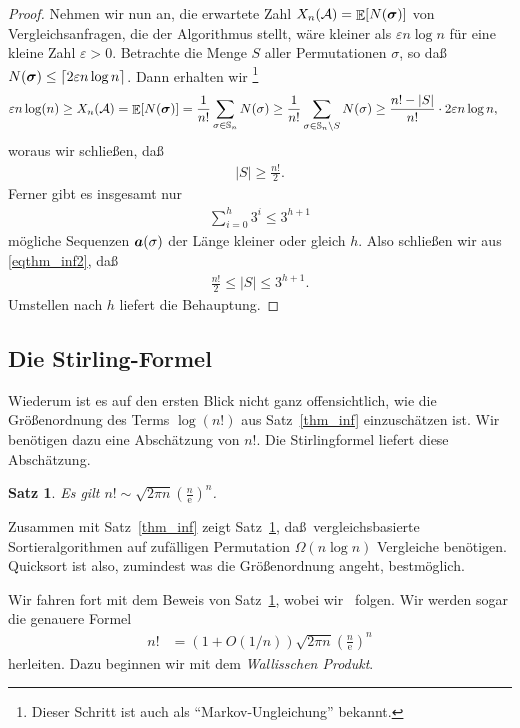 \documentclass[10pt,reqno]{amsart}
\numberwithin{equation}{section}
\newcommand\cA{\mathcal A}
\newcommand\va{\vec a}
\renewcommand\SS{\mathbb S}
\def\vec#1{\mathchoice{\mbox{\boldmath$\displaystyle#1$}}
{\mbox{\boldmath$\textstyle#1$}}
{\mbox{\boldmath$\scriptstyle#1$}}
{\mbox{\boldmath$\scriptscriptstyle#1$}}}
\DeclareMathOperator{\ex}{\mathbb E}
\newtheorem{theorem}[definition]{Satz}
\newcommand\eul{\mathrm{e}}
\newcommand\eps{\varepsilon}
\newcommand\bc[1]{\left({#1}\right)}
\newcommand\bcfr[2]{\bc{\frac{#1}{#2}}}
\newcommand\Thm{Satz}
\begin{document}
\begin{proof}
	Nehmen wir nun an, die erwartete Zahl $X_n(\cA)=\ex[N(\vec\sigma)]$ von Vergleichsanfragen, die der Algorithmus stellt, w\"are kleiner als $\eps n\log n$ f\"ur eine kleine Zahl $\eps>0$.
	Betrachte die Menge $S$ aller Permutationen $\sigma$, so da\ss\ $N(\vec\sigma)\leq\lceil 2\eps n\log n\rceil$.
	Dann erhalten wir%
	\footnote{Dieser Schritt ist auch als ``Markov-Ungleichung'' bekannt.}
	\begin{align*}
		\eps n\log(n)\geq X_n(\cA)&=\ex[N(\vec\sigma)]=\frac1{n!}\sum_{\sigma\in\SS_n}N(\sigma)\geq\frac1{n!}\sum_{\sigma\in\SS_n\setminus S}N(\sigma)\geq\frac{n!-|S|}{n!}\cdot2\eps n\log n,
	\end{align*}
	woraus wir schlie\ss en, da\ss\
	\begin{align}\label{eqthm_inf2}
		|S|\geq\frac{n!}2.
	\end{align}
	Ferner gibt es insgesamt nur 
	\begin{align*}
		\sum_{i=0}^h3^i\leq 3^{h+1}
	\end{align*}
	m\"ogliche Sequenzen $\va(\sigma)$ der L\"ange kleiner oder gleich $h$.
	Also schlie\ss en wir aus \eqref{eqthm_inf2}, da\ss
	\begin{align*}
		\frac{n!}2\leq|S|\leq 3^{h+1}.
	\end{align*}
	Umstellen nach $h$ liefert die Behauptung.
\end{proof}

\subsection{Die Stirling-Formel}\label{sec_stirling}
Wiederum ist es auf den ersten Blick nicht ganz offensichtlich, wie die Gr\"o\ss enordnung des Terms $\log(n!)$ aus \Thm~\ref{thm_inf} einzusch\"atzen ist.
Wir ben\"otigen dazu eine Absch\"atzung von $n!$.
Die Stirlingformel liefert diese Absch\"atzung.

\begin{theorem}\label{thm_stirling}
	Es gilt $n!\sim\sqrt{2\pi n}\bcfr n\eul^n$.
\end{theorem}

Zusammen mit \Thm~\ref{thm_inf} zeigt \Thm~\ref{thm_stirling}, da\ss\ vergleichsbasierte Sortieralgorithmen auf zuf\"alligen Permutation $\Omega(n\log n)$ Vergleiche ben\"otigen.
Quicksort ist also, zumindest was die Gr\"o\ss enordnung angeht, bestm\"oglich.

Wir fahren fort mit dem Beweis von \Thm~\ref{thm_stirling}, wobei wir~\cite{Lang} folgen.
Wir werden sogar die genauere Formel
\begin{align*}
	n!&=(1+O(1/n))\sqrt{2\pi n}\bcfr n\eul^n
\end{align*}
herleiten.
Dazu beginnen wir mit dem {\em Wallisschen Produkt}.
\end{document}
